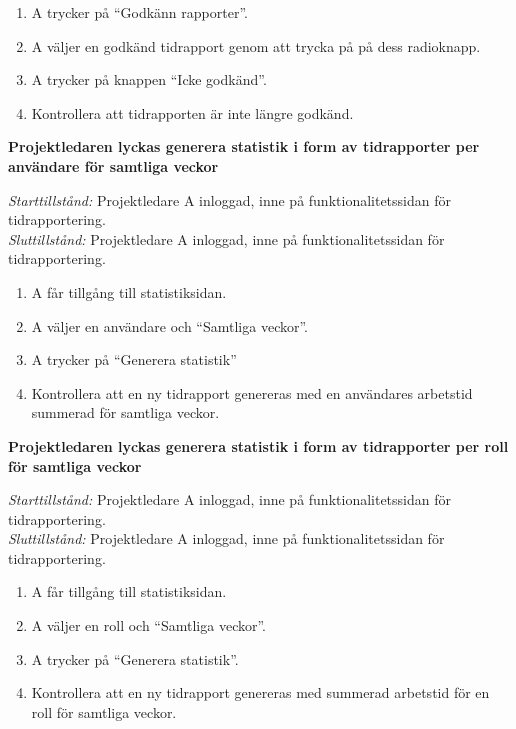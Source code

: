 \documentclass[a4paper]{article}
\begin{document}
\begin{FT}
\begin{enumerate}
\item A trycker på ``Godkänn rapporter''.
\item A väljer en godkänd tidrapport genom att trycka på på dess radioknapp.
\item A trycker på knappen ``Icke godkänd''.
\item Kontrollera att tidrapporten är inte längre godkänd.
\end{enumerate}



\item
\textbf{Projektledaren lyckas generera statistik i form av tidrapporter per användare för samtliga veckor}

\emph{Starttillstånd:} Projektledare A inloggad, inne på funktionalitetssidan för tidrapportering.\\
\emph{Sluttillstånd:} Projektledare A inloggad, inne på funktionalitetssidan för tidrapportering.

\begin{enumerate}
\item A får tillgång till statistiksidan.
\item A väljer en användare och ``Samtliga veckor''.
\item A trycker på ``Generera statistik''
\item Kontrollera att en ny tidrapport genereras med en användares arbetstid summerad för samtliga veckor.
\end{enumerate}



\item
\textbf{Projektledaren lyckas generera statistik i form av tidrapporter per roll för samtliga veckor}

\emph{Starttillstånd:} Projektledare A inloggad, inne på funktionalitetssidan för tidrapportering.\\
\emph{Sluttillstånd:} Projektledare A inloggad, inne på funktionalitetssidan för tidrapportering.

\begin{enumerate}
\item A får tillgång till statistiksidan.
\item A väljer en roll och ``Samtliga veckor''.
\item A trycker på ``Generera statistik''.
\item Kontrollera att en ny tidrapport genereras med summerad arbetstid för en roll för samtliga veckor.
\end{enumerate}



\end{FT}
\end{document}
